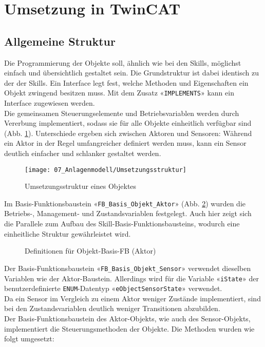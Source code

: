 \section{Umsetzung in TwinCAT} \label{Objektumsetzung in TwinCAT}
	\subsection{Allgemeine Struktur} \label{Objekt_Allgemeine Struktur}
		Die Programmierung der Objekte soll, ähnlich wie bei den Skills, möglichst einfach und übersichtlich gestaltet sein. Die Grundstruktur ist dabei identisch zu der der Skills. Ein Interface legt fest, welche Methoden und Eigenschaften ein Objekt zwingend besitzen muss. Mit dem Zusatz «\verb|IMPLEMENTS|» kann ein Interface zugewiesen werden.
		\\
		Die gemeinsamen Steuerungselemente und Betriebsvariablen werden durch Vererbung implementiert, sodass sie für alle Objekte einheitlich verfügbar sind (Abb. \ref{fig:Umsetzungsstruktur}). Unterschiede ergeben sich zwischen Aktoren und Sensoren: Während ein Aktor in der Regel umfangreicher definiert werden muss, kann ein Sensor deutlich einfacher und schlanker gestaltet werden.
		\\
		\begin{figure}[h!]
			\centering
			\texttt{[image: 07\_Anlagenmodell/Umsetzungsstruktur]}
			\captionsetup{justification=centering}
			\caption{Umsetzungsstruktur eines Objektes}
			\label{fig:Umsetzungsstruktur}
		\end{figure}
		
		\newpage
		
		Im Basis-Funktionsbaustein «\verb|FB_Basis_Objekt_Aktor|» (Abb. \ref{fig:FB_Basis_Objekt}) wurden die Betriebs-, Management- und Zustandsvariablen festgelegt. Auch hier zeigt sich die Parallele zum Aufbau des Skill-Basis-Funktionsbausteins, wodurch eine einheitliche Struktur gewährleistet wird.
		
		\begin{figure}[h!]
			\centering
			\captionsetup{justification=centering}
			\caption{Definitionen für Objekt-Basis-FB (Aktor)}
			\label{fig:FB_Basis_Objekt}
		\end{figure}
		
		Der Basis-Funktionsbaustein «\verb|FB_Basis_Objekt_Sensor|» verwendet dieselben Variablen wie der Aktor-Baustein. Allerdings wird für die Variable «\verb|iState|» der benutzerdefinierte \verb|ENUM|-Datentyp «\verb|eObjectSensorState|» verwendet. 
		\\
		Da ein Sensor im Vergleich zu einem Aktor weniger Zustände implementiert, sind bei den Zustandsvariablen deutlich weniger Transitionen abzubilden.
		\\
		Der Basis-Funktionsbaustein des Aktor-Objekts, wie auch des Sensor-Objekts, implementiert die Steuerungsmethoden der Objekte. Die Methoden wurden wie folgt umgesetzt:
		
